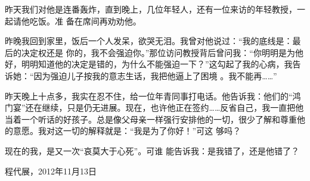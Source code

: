 \documentclass{article}
\begin{document}
昨天我们对他是连番轰炸，直到晚上，几位年轻人，还有一位来访的年轻教授，一起请他吃饭。准
备在席间再劝劝他。 

昨晚我回到家里，饭后一个人发呆，欲哭无泪。我曾对他说过：“我的底线是：最后的决定权还是
\newpage
你的，我不会强迫你。”那位访问教授背后曾问我：“你明明是为他好，明明知道他的决定是错的，为什么不能强迫一下？”这勾起了我的心病，我告诉她：“因为强迫儿子按我的意志生话，我把他逼上了困境
。我不能再……” 

昨天晚上十点多，我实在忍不住，给一位年青同事打电话。他告诉我：他们的“鸿门宴”还在继续，只是仍无进展。现在，也许他正在签约……反省自己，我一直把他当着一个听话的好孩子。总是像父母亲一样强行安排他的一切，很少了解和尊重他的意愿。我对这一切的解释就是：“我是为了你好！”可这
够吗？ 

现在的我，是又一次“哀莫大于心死”。可谁
能告诉我：是我错了，还是他错了？ 

程代展，2012年11月13日
\end{document}
